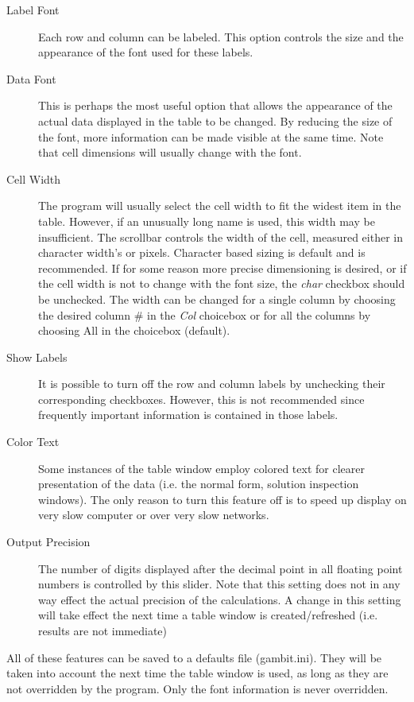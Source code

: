 \begin{description}
\item[Label Font] Each row and column can be labeled.  This option controls
the size and the appearance of the font used for these labels.
\item[Data Font] This is perhaps the most useful option that allows the 
appearance of the actual data displayed in the table to be changed.  By
reducing the size of the font, more information can be made visible at the
same time.  Note that cell dimensions will usually change with the font.
\item[Cell Width] The program will usually select the cell width to fit the
widest item in the table.  However, if an unusually long name is used,
this width may be insufficient.  The scrollbar controls the width of the
cell, measured either in character width's or pixels.  Character based
sizing is default and is recommended.  If for some reason more precise
dimensioning is desired, or if the cell width is not to change with the
font size, the {\em char} checkbox should be unchecked.  The width can be
changed for a single column by choosing the desired column \# in the {\em
Col} choicebox or for all the columns by choosing All in the choicebox
(default).
\item[Show Labels] It is possible to turn off the row and column labels by 
unchecking their corresponding checkboxes.  However, this is not
recommended since frequently important information is contained in those
labels.
\item[Color Text] Some instances of the table window employ colored text 
for clearer presentation of the data (i.e. the normal form, solution
inspection windows).  The only reason to turn this feature off is to speed
up display on very slow computer or over very slow networks.
\item[Output Precision] The number of digits displayed after the decimal point
in all floating point numbers is controlled by this slider.  Note that this
setting does not in any way effect the actual precision of the calculations.
A change in this setting will take effect the next time a table window is
created/refreshed (i.e. results are not immediate)
\end{description}

All of these features can be saved to a defaults file (gambit.ini).  They
will be taken into account the next time the table window is used, as long
as they are not overridden by the program.  Only the font information is
never overridden.


